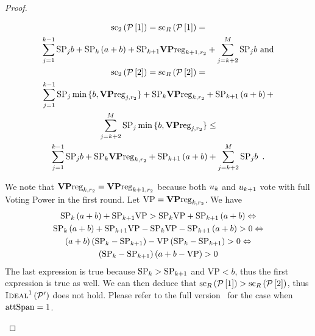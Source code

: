 \documentclass[a4paper,english,cleveref, autoref]{oasics-v2019}
\begin{document}
\begin{subappendices}
\begin{proof}
\begin{itemize}
    \begin{gather*}
      \mathrm{sc}_2\left(\mathcal{P}\left[1\right]\right) =
      \mathrm{sc}_R\left(\mathcal{P}\left[1\right]\right) = \\
      \sum\limits_{j = 1}^{k-1}\mathrm{SP}_j b + \mathrm{SP}_k \left(a + b\right) +
      \mathrm{SP}_{k+1} \mathrm{\textbf{VP}reg}_{k+1,r_2} + \sum\limits_{j = k +
      2}^{M}\mathrm{SP}_j b \text{ and} \\
      \mathrm{sc}_2\left(\mathcal{P}\left[2\right]\right) =
      \mathrm{sc}_R\left(\mathcal{P}\left[2\right]\right) = \\
      \sum\limits_{j = 1}^{k-1}\mathrm{SP}_j \min{\{b, \mathrm{\textbf{VP}reg}_{j, r_2}\}} +
      \mathrm{SP}_k \mathrm{\textbf{VP}reg}_{k, r_2} + \mathrm{SP}_{k+1} \left(a + b\right) + \\
      \sum\limits_{j = k + 2}^{M}\mathrm{SP}_j \min{\{b, \mathrm{\textbf{VP}reg}_{j,
      r_2}\}} \leq \\
      \sum\limits_{j = 1}^{k-1}\mathrm{SP}_j b + \mathrm{SP}_k \mathrm{\textbf{VP}reg}_{k, r_2} +
      \mathrm{SP}_{k+1} \left(a + b\right) +
      \sum\limits_{j = k + 2}^{M}\mathrm{SP}_j b \enspace.
    \end{gather*}

    We note that $\mathrm{\textbf{VP}reg}_{k, r_2} = \mathrm{\textbf{VP}reg}_{k+1, r_2}$ because
    both $u_k$ and $u_{k+1}$ vote with full Voting Power in the
    first round. Let $\mathrm{VP} = \mathrm{\textbf{VP}reg}_{k, r_2}$. We have
    \begin{gather*}
      \mathrm{SP}_k \left(a + b\right) + \mathrm{SP}_{k+1} \mathrm{VP} > \mathrm{SP}_k
      \mathrm{VP} + \mathrm{SP}_{k+1} \left(a + b\right) \Leftrightarrow \\
      \mathrm{SP}_k \left(a + b\right) + \mathrm{SP}_{k+1} \mathrm{VP} - \mathrm{SP}_k
      \mathrm{VP} - \mathrm{SP}_{k+1} \left(a + b\right) > 0 \Leftrightarrow \\
      \left(a + b\right) \left(\mathrm{SP}_k - \mathrm{SP}_{k+1}\right) - \mathrm{VP}
      \left(\mathrm{SP}_k - \mathrm{SP}_{k+1}\right) > 0 \Leftrightarrow \\
      \left(\mathrm{SP}_k - \mathrm{SP}_{k+1}\right) \left(a + b - \mathrm{VP}\right) > 0
    \end{gather*}
    The last expression is true because $\mathrm{SP}_k > \mathrm{SP}_{k+1}$ and
    $\mathrm{VP} < b$, thus the first expression is true as well. We can then
    deduce that $\mathrm{sc}_R\left(\mathcal{P}\left[1\right]\right) >
    \mathrm{sc}_R\left(\mathcal{P}\left[2\right]\right)$, thus
    $\textsc{Ideal}^1\left(\mathcal{P}'\right)$ does not hold. Please refer to the
    full version~\cite{kiayias2018apuff} for the case when $\mathrm{attSpan} = 1$.


\end{itemize}
\end{proof}
\end{subappendices}
\end{document}
